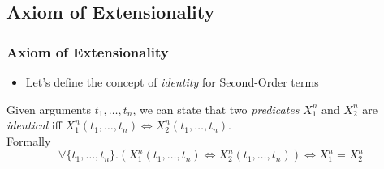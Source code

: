 \documentclass{beamer}
\begin{document}
            \subsection{Axiom of Extensionality}
                \begin{frame}
                    \frametitle{Axiom of Extensionality}
                    \begin{itemize}
                        \item Let's define the concept of \textit{identity} for Second-Order terms
                    \end{itemize}
                    \begin{definition}
                        Given arguments $ t_1, \dots, t_n $, we can state that two \textit{predicates} $ X_1^n $ and $ X_2^n $ are \textit{identical} iff $ X_1^n(t_1, \dots, t_n) \Leftrightarrow X_2^n(t_1, \dots, t_n) $.\\
                        Formally
                        \[
                            \forall \{ t_1, \dots, t_n \}. (X_1^n(t_1, \dots, t_n) \Leftrightarrow X_2^n(t_1, \dots, t_n)) \Leftrightarrow X_1^n = X_2^n
                        \]
                    \end{definition}
                \end{frame}
\end{document}
